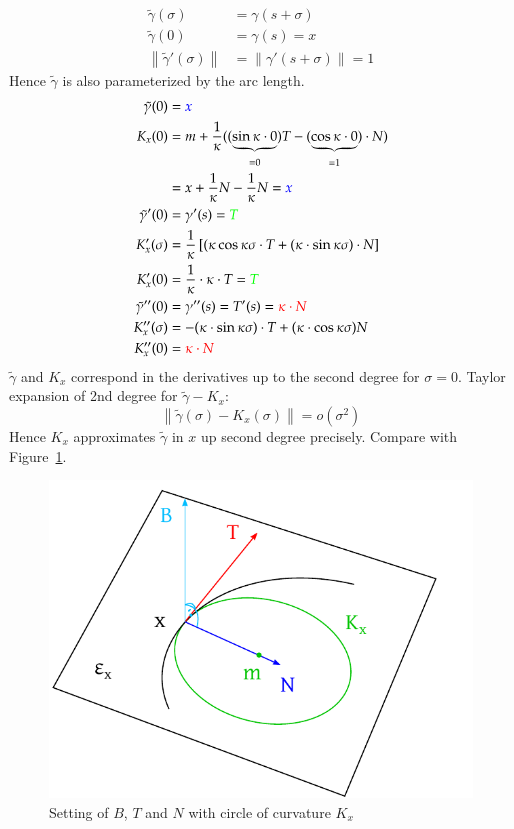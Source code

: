 \documentclass{article}
\newcommand{\norm}[1]{\left\|#1\right\|}
\begin{document}
\begin{align*}
  \tilde\gamma(\sigma) &= \gamma(s + \sigma) \\
  \tilde\gamma(0) &= \gamma(s) = x \\
  \norm{\tilde\gamma'(\sigma)} &= \norm{\gamma'(s + \sigma)} = 1
\end{align*}
Hence $\tilde\gamma$ is also parameterized by the arc length.
\begin{align*}
  \tilde\gamma(0) &= {\color{blue} x} \\
  K_x(0) &= m + \frac{1}{\kappa}((\underbrace{\sin{\kappa \cdot 0}}_{= 0}) T - (\underbrace{\cos{\kappa \cdot 0}}_{=1}) \cdot N) \\
    &= x + \frac{1}{\kappa} N - \frac{1}{\kappa} N = {\color{blue} x} \\
  \tilde\gamma'(0) &= \gamma'(s) = {\color{green} T} \\
  K_x'(\sigma) &= \frac{1}{\kappa} \left[(\kappa \cos{\kappa \sigma} \cdot T + (\kappa \cdot \sin{\kappa\sigma}) \cdot N\right] \\
  K_x'(0) &= \frac{1}{\kappa} \cdot \kappa \cdot T = {\color{green} T} \\
  \tilde\gamma''(0) &= \gamma''(s) = T'(s) = {\color{red} \kappa \cdot N} \\
  K_x''(\sigma) &= -(\kappa\cdot \sin{\kappa\sigma}) \cdot T + (\kappa \cdot \cos{\kappa\sigma}) N \\
  K_x''(0) &= {\color{red} \kappa \cdot N}
\end{align*}
$\tilde\gamma$ and $K_x$ correspond in the derivatives up to the second degree for $\sigma = 0$.
Taylor expansion of 2nd degree for $\tilde\gamma - K_x$:
\[ \norm{\tilde\gamma(\sigma) - K_x(\sigma)} = o(\sigma^2) \]
Hence $K_x$ approximates $\tilde\gamma$ in $x$ up second degree precisely.
Compare with Figure~\ref{img:btnkx}.

\begin{figure}[t]
  \begin{center}
    \includegraphics{img/53_taylor.pdf}
    \caption{Setting of $B$, $T$ and $N$ with circle of curvature $K_x$}
    \label{img:btnkx}
  \end{center}
\end{figure}
\end{document}

